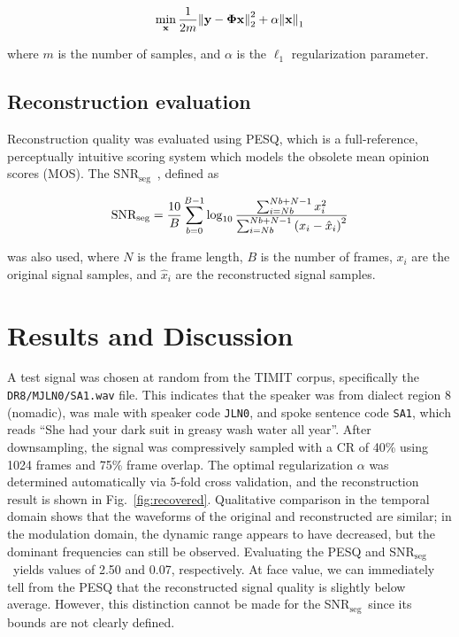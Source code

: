 \documentclass[10pt,a4paper,twoside]{article}
\newcommand{\snrseg}{SNR$_{\mathrm{seg}}$}
\begin{document}
\begin{equation}\label{eq:lasso}
	\min_{\text{\bfseries x}} \frac{1}{2m} \norm{\text{\bfseries y} - \bm\Phi \text{\bfseries x}}_2^2 + \alpha\norm{\text{\bfseries x}}_1
\end{equation}

\noindent where $m$ is the number of samples, and $\alpha$ is the $\ell_1$ regularization parameter.

\subsection{Reconstruction evaluation}\label{ssec:eval}
Reconstruction quality was evaluated using PESQ, which is a full-reference, perceptually intuitive scoring system which models the obsolete mean opinion scores (MOS). The \snrseg~, defined as

\begin{equation}\label{eq:snrseg}
	\mathrm{SNR_{seg}} = \frac{10}{B} \sum_{b=0}^{B-1} \log_{10} \frac{\sum_{i=Nb}^{Nb+N-1} x_i^2}{\sum_{i=Nb}^{Nb+N-1} \qty(x_i - \hat{x}_i)^2}
\end{equation}

\noindent was also used, where $N$ is the frame length, $B$ is the number of frames, $x_i$ are  the original signal samples, and $\hat{x}_i$ are the reconstructed signal samples.


\section{Results and Discussion}
A test signal was chosen at random from the TIMIT corpus, specifically the \texttt{DR8/MJLN0/SA1.wav} file. This indicates that the speaker was from dialect region 8 (nomadic), was male with speaker code \texttt{JLN0}, and spoke sentence code \texttt{SA1}, which reads ``She had your dark suit in greasy wash water all year''. After downsampling, the signal was compressively sampled with a CR of 40\% using 1024 frames and 75\% frame overlap. The optimal regularization $\alpha$ was determined automatically via 5-fold cross validation, and the reconstruction result is shown in Fig.~\ref{fig:recovered}. Qualitative comparison in the temporal domain shows that the waveforms of the original and reconstructed are similar; in the modulation domain, the dynamic range appears to have decreased, but the dominant frequencies can still be observed. Evaluating the PESQ and \snrseg~yields values of 2.50 and 0.07, respectively. At face value, we can immediately tell from the PESQ that the reconstructed signal quality is slightly below average. However, this distinction cannot be made for the \snrseg~since its bounds are not clearly defined.
\end{document}
